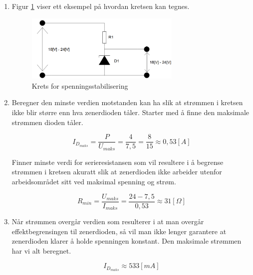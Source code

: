 \begin{solution}[name=Løsningsforslag oppgave]
\begin{enumerate}[label=\roman*)]
	\item Figur \ref{fig:zenKrets1} viser ett eksempel på hvordan kretsen kan tegnes.
		\begin{figure}[H]
			\centering
			\includegraphics[width=0.7\textwidth]{diode/figurer/zenKrets1.png}
			\caption{Krets for spenningsstabilisering}
			\label{fig:zenKrets1}
		\end{figure}
	\item Beregner den minste verdien motstanden kan ha slik at strømmen i kretsen ikke blir større enn hva zenerdioden tåler. Starter med å finne den maksimale strømmen dioden tåler.
	
	\[I_{D_{maks}}=\frac{P}{U_{maks}}=\frac{4}{7,5}=\frac{8}{15}\approx 0,53 [A]\]
	
	Finner minste verdi for serieresistansen som vil resultere i å begrense strømmen i kretsen akuratt slik at zenerdioden ikke arbeider utenfor arbeidsområdet sitt ved maksimal spenning og strøm.
	
	\[R_{min}= \frac{U_{maks}}{I_{maks}}= \frac{24-7,5}{0,53} \approx 31 [\Omega]\]
	
	\item Når strømmen overgår verdien som resulterer i at man overgår effektbegrensingen til zenerdioden, så vil man ikke lenger garantere at zenerdioden klarer å holde spenningen konstant. Den maksimale strømmen har vi alt beregnet.
	
	\[I_{D_{maks}} \approx 533 [mA]\]
\end{enumerate}
\end{solution}


